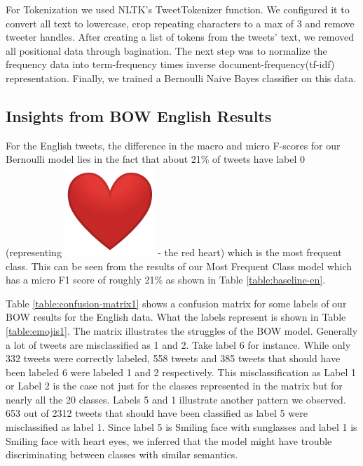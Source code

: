 \documentclass[11pt,a4paper]{article}
\newcommand{\redheart}{%
  \begingroup\normalfont
  \includegraphics[height=\fontcharht\font`\B]{emojis/emoji_u2764.png}%
  \endgroup
}
\begin{document}
For Tokenization we used NLTK's TweetTokenizer function. We configured it to convert all text to lowercase, crop repeating characters to a max of 3 and remove tweeter handles. After creating a list of tokens from the tweets' text, we removed all positional data through bagination. The next step was to normalize the frequency data into term-frequency times inverse document-frequency(tf-idf) representation. Finally, we trained a Bernoulli Naive Bayes classifier on this data.

\subsection{Insights from BOW English Results}
  For the English tweets, the difference in the macro and micro F-scores for our Bernoulli model lies in the fact that about 21\% of tweets have label 0 (representing \redheart{}  - the red heart) which is the most frequent class. This can be seen from the results of our Most Frequent Class model which has a micro F1 score of roughly 21\% as shown in Table \ref{table:baseline-en}. 

Table \ref{table:confusion-matrix1} shows a confusion matrix for some labels of our BOW results for the English data. What the labels represent is shown in Table \ref{table:emojis1}. The matrix illustrates the struggles of the BOW model.  Generally a lot of tweets are misclassified as 1 and 2. Take label 6 for instance. While only 332 tweets were correctly labeled, 558 tweets and 385 tweets that should have been labeled 6 were labeled 1 and 2 respectively. This misclassification as Label 1 or Label 2 is the case not just for the classes represented in the matrix but for nearly all the 20 classes. Labels 5 and 1 illustrate another pattern we observed. 653 out of 2312 tweets that should have been classified as label 5 were misclassified as label 1. Since label 5 is Smiling face with sunglasses and label 1 is Smiling face with heart eyes, we inferred that the model might have trouble discriminating between classes with similar semantics.
\end{document}
